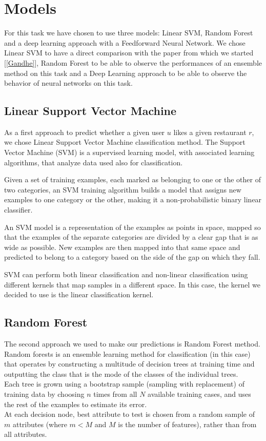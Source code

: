 
\section{Models}\label{sec:models}

For this task we have chosen to use three models: Linear SVM, Random Forest and a deep learning approach with a Feedforward Neural Network. We chose Linear SVM to have a direct comparison with the paper from which we started [\ref{Gandhe}], Random Forest to be able to observe the performances of an ensemble method on this task and a Deep Learning approach to be able to observe the behavior of neural networks on this task.

\subsection{Linear Support Vector Machine}
As a first approach to predict whether a given user $u$ likes a given restaurant $r$, we chose Linear Support Vector Machine classification method. The Support Vector Machine (SVM) is a supervised learning model, with associated learning algorithms, that analyze data used also for classification.

Given a set of training examples, each marked as belonging to one or the other of two categories, an SVM training algorithm builds a model that assigns new examples to one category or the other, making it a non-probabilistic binary linear classifier.

An SVM model is a representation of the examples as points in space, mapped so that the examples of the separate categories are divided by a clear gap that is as wide as possible. New examples are then mapped into that same space and predicted to belong to a category based on the side of the gap on which they fall.

SVM can perform both linear classification and non-linear classification using different kernels that map samples in a different space. In this case, the kernel we decided to use is the linear classification kernel.


\subsection{Random Forest}
The second approach we used to make our predictions is Random Forest method. Random forests is an ensemble learning method for classification (in this case) that operates by constructing a multitude of decision trees at training time and outputting the class that is the mode of the classes of the individual trees. \\
Each tree is grown using a bootstrap sample (sampling with replacement) of training data by choosing $n$ times from all $N$ available training cases, and uses the rest of the examples to estimate its error. \\
At each decision node, best attribute to test is chosen from a random sample of $m$ attributes (where $m < M$ and $M$ is the number of features), rather than from all attributes.

